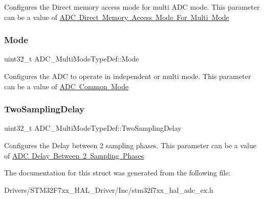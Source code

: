 Configures the Direct memory access mode for multi A\+DC mode. This parameter can be a value of \mbox{\hyperlink{group___a_d_c_ex___direct__memory__access__mode__for__multi__mode}{A\+DC Direct Memory Access Mode For Multi Mode}} \mbox{\label{struct_a_d_c___multi_mode_type_def_a424b5606c9d5dfbfdc850080d34552ff}} 
\subsubsection{\texorpdfstring{Mode}{Mode}}
{\footnotesize\ttfamily uint32\+\_\+t A\+D\+C\+\_\+\+Multi\+Mode\+Type\+Def\+::\+Mode}

Configures the A\+DC to operate in independent or multi mode. This parameter can be a value of \mbox{\hyperlink{group___a_d_c_ex___common__mode}{A\+DC Common Mode}} \mbox{\label{struct_a_d_c___multi_mode_type_def_a5590cc138c49a97c6433caa29592cd1b}} 
\subsubsection{\texorpdfstring{TwoSamplingDelay}{TwoSamplingDelay}}
{\footnotesize\ttfamily uint32\+\_\+t A\+D\+C\+\_\+\+Multi\+Mode\+Type\+Def\+::\+Two\+Sampling\+Delay}

Configures the Delay between 2 sampling phases. This parameter can be a value of \mbox{\hyperlink{group___a_d_c__delay__between__2__sampling__phases}{A\+DC Delay Between 2 Sampling Phases}} 

The documentation for this struct was generated from the following file\+:\begin{DoxyCompactItemize}
\item 
Drivers/\+S\+T\+M32\+F7xx\+\_\+\+H\+A\+L\+\_\+\+Driver/\+Inc/stm32f7xx\+\_\+hal\+\_\+adc\+\_\+ex.\+h\end{DoxyCompactItemize}
